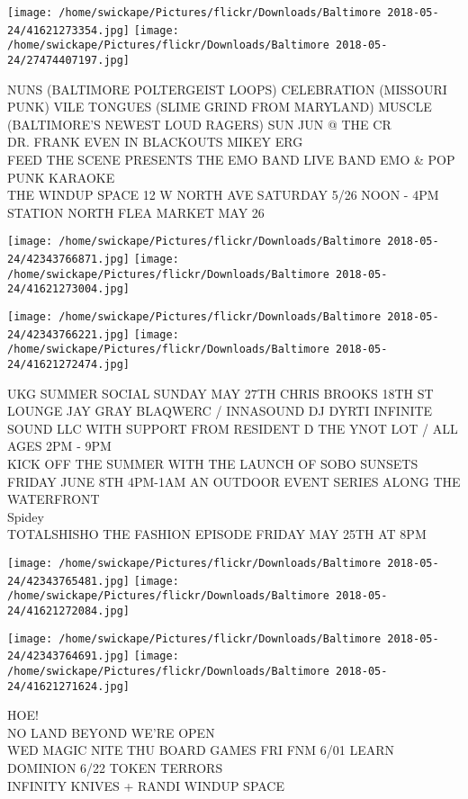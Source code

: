 \documentclass[10pt,letterpaper]{article}
\begin{document}
\texttt{[image: /home/swickape/Pictures/flickr/Downloads/Baltimore 2018-05-24/41621273354.jpg]}
\texttt{[image: /home/swickape/Pictures/flickr/Downloads/Baltimore 2018-05-24/27474407197.jpg]}

NUNS (BALTIMORE POLTERGEIST LOOPS) CELEBRATION (MISSOURI PUNK) VILE TONGUES (SLIME GRIND FROM MARYLAND) MUSCLE (BALTIMORE'S NEWEST LOUD RAGERS) SUN JUN @ THE CR\\
DR. FRANK EVEN IN BLACKOUTS MIKEY ERG\\
FEED THE SCENE PRESENTS THE EMO BAND LIVE BAND EMO \& POP PUNK KARAOKE\\
THE WINDUP SPACE 12 W NORTH AVE SATURDAY 5/26 NOON {-} 4PM STATION NORTH FLEA MARKET MAY 26\\
\pagebreak

\texttt{[image: /home/swickape/Pictures/flickr/Downloads/Baltimore 2018-05-24/42343766871.jpg]}
\texttt{[image: /home/swickape/Pictures/flickr/Downloads/Baltimore 2018-05-24/41621273004.jpg]}

\texttt{[image: /home/swickape/Pictures/flickr/Downloads/Baltimore 2018-05-24/42343766221.jpg]}
\texttt{[image: /home/swickape/Pictures/flickr/Downloads/Baltimore 2018-05-24/41621272474.jpg]}

UKG SUMMER SOCIAL SUNDAY MAY 27TH CHRIS BROOKS 18TH ST LOUNGE JAY GRAY BLAQWERC / INNASOUND DJ DYRTI INFINITE SOUND LLC WITH SUPPORT FROM RESIDENT D THE YNOT LOT / ALL AGES 2PM {-} 9PM\\
KICK OFF THE SUMMER WITH THE LAUNCH OF SOBO SUNSETS FRIDAY JUNE 8TH 4PM{-}1AM AN OUTDOOR EVENT SERIES ALONG THE WATERFRONT\\
Spidey\\
TOTALSHISHO THE FASHION EPISODE FRIDAY MAY 25TH AT 8PM\\
\pagebreak

\texttt{[image: /home/swickape/Pictures/flickr/Downloads/Baltimore 2018-05-24/42343765481.jpg]}
\texttt{[image: /home/swickape/Pictures/flickr/Downloads/Baltimore 2018-05-24/41621272084.jpg]}

\texttt{[image: /home/swickape/Pictures/flickr/Downloads/Baltimore 2018-05-24/42343764691.jpg]}
\texttt{[image: /home/swickape/Pictures/flickr/Downloads/Baltimore 2018-05-24/41621271624.jpg]}

HOE!\\
NO LAND BEYOND WE'RE OPEN\\
WED MAGIC NITE THU BOARD GAMES FRI FNM 6/01 LEARN DOMINION 6/22 TOKEN TERRORS\\
INFINITY KNIVES + RANDI WINDUP SPACE\\
\pagebreak
\end{document}
